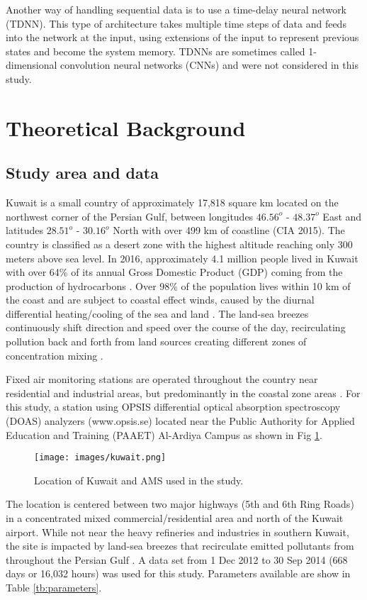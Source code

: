 \documentclass[preprint,12pt,authoryear]{elsarticle}
\begin{document}
\begin{linenumbers}
Another way of handling sequential data is to use a time-delay neural network (TDNN). This type of architecture takes multiple time steps of data and feeds into the network at the input, using extensions of the input to represent previous states and become the system memory. TDNNs are sometimes called 1-dimensional convolution neural networks (CNNs) \citep{Goodfellow2016} and were not considered in this study.

\section{Theoretical Background}

\subsection{Study area and data}
Kuwait is a small country of approximately 17,818 square km located on the northwest corner of the Persian Gulf, between longitudes $46.56^{o}$ - $48.37^{o}$ East and latitudes $28.51^{o}$ - $30.16^{o}$ North with over 499 km of coastline (CIA 2015).  The country is classified as a desert zone with the highest altitude reaching only 300 meters above sea level. In 2016, approximately 4.1 million people lived in Kuwait \citep{CSB2016} with over 64\% of its annual Gross Domestic Product (GDP) coming from the production of hydrocarbons \citep{KAMCO2013}.  Over 98\% of the population lives within 10 km of the coast and are subject to coastal effect winds, caused by the diurnal differential heating/cooling of the sea and land \citep{Crosman2010, Cuxart2014}.  The land-sea breezes continuously shift direction and speed over the course of the day, recirculating pollution back and forth from land sources creating different zones of concentration mixing \citep{Freeman2016}.

Fixed air monitoring stations are operated throughout the country near residential and industrial areas, but predominantly in the coastal zone areas \citep{Freeman2016a}. For this study, a station using OPSIS differential optical absorption spectroscopy (DOAS) analyzers (www.opsis.se) located near the Public Authority for Applied Education and Training (PAAET) Al-Ardiya Campus as shown in Fig \ref{fig:Kuwait}. 
%
\begin{figure}[H]
\centering
\texttt{[image: images/kuwait.png]}  %
\caption{Location of Kuwait and AMS used in the study.}
\label{fig:Kuwait}
\end{figure}
%
The location is centered between two major highways (5th and 6th Ring Roads) in a concentrated mixed commercial/residential area and north of the Kuwait airport. While not near the heavy refineries and industries in southern Kuwait, the site is impacted by land-sea breezes that recirculate emitted pollutants from throughout the Persian Gulf \citep{Freeman2016}. A data set from 1 Dec 2012 to 30 Sep 2014 (668 days or 16,032 hours) was used for this study. Parameters available are show in Table \ref{tb:parameters}.

\end{linenumbers}
\end{document}
